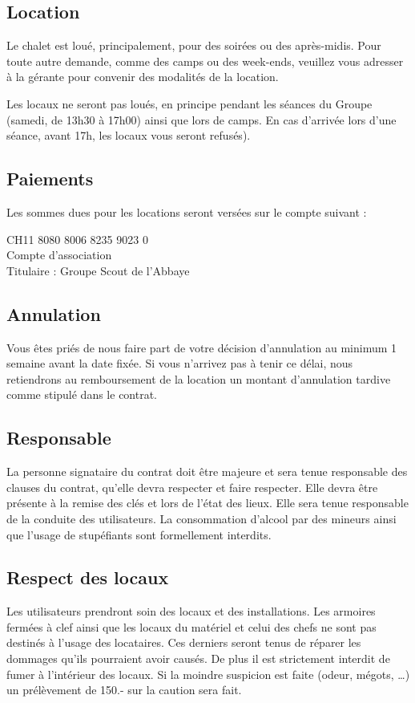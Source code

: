 \documentclass[a4paper,12pt]{extarticle}
\begin{document}
\subsection{Location}

Le chalet est loué, principalement, pour des soirées ou des après-midis.
Pour toute autre demande, comme des camps ou des week-ends, veuillez vous adresser à la gérante pour convenir des modalités de la location.

{\color{red} Les locaux ne seront pas loués, en principe pendant les séances du Groupe (samedi, de 13h30 à 17h00) ainsi que lors de camps. En cas d'arrivée lors d'une séance, avant 17h, les locaux vous seront refusés). }

\subsection{Paiements}
Les sommes dues pour les locations seront versées sur le compte suivant :

CH11 8080 8006 8235 9023 0 \\
Compte d'association \\
Titulaire : Groupe Scout de l'Abbaye \\

\subsection{Annulation}

Vous êtes priés de nous faire part de votre décision d'annulation au minimum 1 semaine avant la date fixée.
Si vous n'arrivez pas à tenir ce délai, nous retiendrons au remboursement de la location un montant d'annulation tardive comme stipulé dans le contrat.

\subsection{Responsable}
La personne signataire du contrat doit être majeure et sera tenue responsable des clauses du contrat, qu'elle devra respecter et faire respecter.
Elle devra être présente à la remise des clés et lors de l'état des lieux. Elle sera tenue responsable de la conduite des utilisateurs.
La consommation d'alcool par des mineurs ainsi que l'usage de stupéfiants sont formellement interdits.

\subsection{Respect des locaux}
Les utilisateurs prendront soin des locaux et des installations.
Les armoires fermées à clef ainsi que les locaux du matériel et celui des chefs ne sont pas destinés à l'usage des locataires.
Ces derniers seront tenus de réparer les dommages qu'ils pourraient avoir causés.
De plus {\color{red} il est strictement interdit de fumer à l'intérieur des locaux.}
Si la moindre suspicion est faite (odeur, mégots, …) un prélèvement de 150.- sur la caution sera fait.
\end{document}
